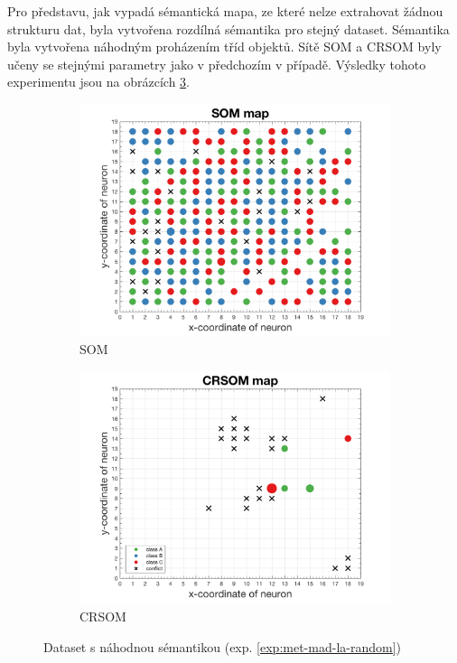 \documentclass[thesis=M,czech]{FITthesis}[2012/06/26]
\begin{document}
Pro představu, jak vypadá sémantická mapa, ze které nelze extrahovat žádnou strukturu dat, byla vytvořena rozdílná sémantika pro stejný dataset. Sémantika byla vytvořena náhodným proházením tříd objektů. Sítě SOM a CRSOM byly učeny  se stejnými parametry jako v předchozím v případě. Výsledky tohoto experimentu jsou na obrázcích \ref{fig:metmadlarandom}.

\begin{figure}
\centering
\begin{subfigure}{.5\textwidth}
  \centering
  \includegraphics[width=.99\linewidth]{exp_met_mad_la_random_som.png}
  \caption{SOM}
  \label{fig:sub1}
\end{subfigure}%
\begin{subfigure}{.5\textwidth}
  \centering
  \includegraphics[width=.99\linewidth]{exp_met_mad_la_random_crsom.png}
  \caption{CRSOM}
  \label{fig:sub2}
\end{subfigure}
\caption{Dataset s náhodnou sémantikou (exp. \ref{exp:met-mad-la-random})}
\label{fig:metmadlarandom}
\end{figure}
\end{document}
